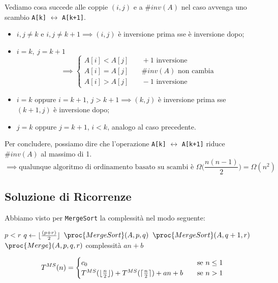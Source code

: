 Vediamo cosa succede alle coppie $(i,j)$ e a $\# inv(A)$ nel caso avvenga uno scambio \texttt{A[k]}
$\leftrightarrow$ \texttt{A[k+1]}.

\begin{itemize}
	\item $i,j \neq k$ e $i,j \neq k+1 \implies (i,j)$ è inversione prima sse è inversione dopo;
	\item $i = k, \ j = k+1$
	\[ \implies
	\begin{cases}
		A[i] < A[j] & \quad +1 \text{ inversione} \\
		A[i] = A[j] & \quad \# inv(A) \text{ non cambia} \\
		A[i] > A[j] & \quad -1 \text{ inversione}
	\end{cases}
	\]
	\item $i = k$ oppure $i = k+1$, $j > k+1 \implies (k,j)$ è inversione prima sse $(k+1,j)$ è
	inversione dopo;
	\item $j = k$ oppure $j = k+1$, $i < k$, analogo al caso precedente.
\end{itemize}

Per concludere, possiamo dire che l'operazione \texttt{A[k]} $\leftrightarrow$ \texttt{A[k+1]}
riduce $\# inv(A)$ al massimo di 1.
\begin{displaymath}
	\implies \text{qualunque algoritmo di ordinamento basato su scambi è } \Omega \Big(\frac{n(n-1)}{2} \Big) = \Omega (n^2)
\end{displaymath}

\subsection{Soluzione di Ricorrenze}
Abbiamo visto per \texttt{MergeSort} la complessità nel modo seguente:

\begin{codebox}
	\li \If $p < r$
	\li     \Then
	$q \gets \lfloor\frac{(p + r)}{2}\rfloor$ 
	\li         $\proc{MergeSort}(A,p,q)$
	\li         $\proc{MergeSort}(A,q+1,r)$
	\li         $\proc{Merge}(A,p,q,r)$
	\Comment complessità $an + b$
	\End
\end{codebox}

\[ T^{MS}(n) =
\begin{cases}
c_0       & \quad \text{se } n \leq 1 \\
T^{MS}(\lfloor\frac{n}{2}\rfloor)+T^{MS}(\lceil\frac{n}{2}\rceil) + an + b  & \quad \text{se } n>1
\end{cases}
\]

